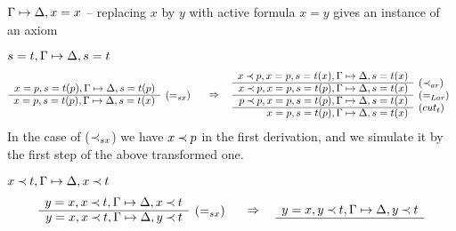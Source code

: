 \begin{PROOF}
\begin{LS}
\item $\Gamma\mathrel{\mapsto}\Delta,x=x$ -- replacing $x$ by $y$ with active formula $x=y$ gives an instance
of an axiom
\item $s=t,\Gamma\mathrel{\mapsto}\Delta,s=t$
\[ \begin{array}{rl}
x=p,s=t(p),\GSD, s=t(p) \\ \cline{1-1}
x=p,s=t(p), \GSD, s=t(x) & \rabove{(=_{sx})}
\end{array}
\conv
\begin{array}{rl}
x\Incl p, x=p,s=t(x),\GSD, s=t(x) \\ \cline{1-1}
x\Incl p, x=p,s=t(p), \GSD, s=t(x) & \rabove{(\Incl_{ar})} \\ \cline{1-1}
p\Incl p, x=p,s=t(p), \GSD, s=t(x) & \rabove{(=_{Lar})} \\ \cline{1-1}
          x=p,s=t(p), \GSD, s=t(x) & \rabove{(cut_t)} 
\end{array}
\]
In the case of ($\mathbin{\prec}_{sx}$) we have $x\mathbin{\prec} p$ in the first derivation, and
we simulate it by the first step of the above transformed one.
\item $x\mathbin{\prec} t,\Gamma\mathrel{\mapsto}\Delta,x\mathbin{\prec} t$
\[ \begin{array}{rl}
y=x, x\Incl t,\GSD,x\Incl t \\ \cline{1-1}
y=x, x\Incl t,\GSD,y\Incl t & \rabove{(=_{sx})}
\end{array}
\conv
\begin{array}{rl}
y=x, y\Incl t,\GSD,y\Incl t \\ \cline{1-1}

\end{array}\]
\end{LS}
\end{PROOF}
